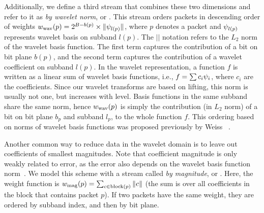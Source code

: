 Additionally, we define a third stream that combines these two dimensions and refer to it as
\emph{by wavelet norm}, or \swav. This stream orders packets in descending order of weights
$\wwav(p)=2^{B-b(p)}\times \| \wbas_{l(p)} \|$, where $p$ denotes a packet and $\wbas_{l(p)}$
represents wavelet basis on subband $l(p)$. The $||$ notation refers to the $L_2$ norm of the
wavelet basis function. The first term captures the contribution of a bit on bit plane $b(p)$, and
the second term captures the contribution of a wavelet coefficient on subband $l(p)$.
%
%
In the wavelet representation, a function $f$ is written as a linear sum of wavelet basis functions, 
i.e., $f=\sum{c_i\wbas_i}$, where $c_i$ are the coefficients. Since our wavelet transforms
are based on lifting, this norm is usually not one, but increases with level. Basis functions in the
same subband share the same norm, hence $\wwav(p)$ is simply the contribution (in $L_2$ norm) of a
bit on bit plane $b_p$ and subband $l_p$, to the whole function $f$. This ordering based on norms of
wavelet basis functions was proposed previously by Weiss \etal~\cite{weiss}.

Another common way to reduce data in the wavelet domain is to leave out coefficients of smallest
magnitudes. Note that coefficient magnitude is only weakly related to error, as the error also
depends on the wavelet basis function norm~\cite{weiss}. We model this scheme with a stream called
\emph{by magnitude}, or \smag. Here, the weight function is $\wmag(p)=\sum_{c\in
\text{block}(p)}\norm{c}$ (the sum is over all coefficients in the block that contains packet
$p$). If two packets have the same weight, they are ordered by subband index, and then by bit plane.


